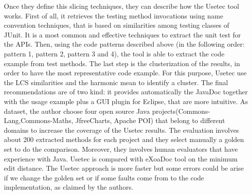 Once they define this slicing techniques, they can describe how the Usetec tool works. First of all, it retrieves the testing method invocations using name convention techniques, that is based on similarities among testing classes of JUnit. It is a most common and effective techniques to extract the unit test for the APIs. Then, using the code patterns described above (in the following order: pattern 1, pattern 2, pattern 3 and 4), the tool is able to extract the code example from test methods. The last step is the clusterization of the results, in order to have the most representative code example. For this purpose, Usetec use the LCS similarities and the harmonic mean to identify a cluster. The final recommendations are of two kind: it provides automatically the JavaDoc together with the usage example plus a GUI plugin for Eclipse, that are more intuitive. As dataset, the author choose four open source Java projects(Commons-Lang,Commons-Maths, JfreeCharts, Apache POI) that belong to different domains to increase the coverage of the Usetec results.  The evaluation involves about 200 extracted methods for each project and they select manually a golden set to do the comparison. Moreover, they involves human evaluators that have experience with Java. Usetec is compared with eXoaDoc tool on the minimum edit distance. The Usetec approach is more faster but some errors could be arise if we change the golden set or if some faults come from to the code implementation, as claimed by the authors. 

